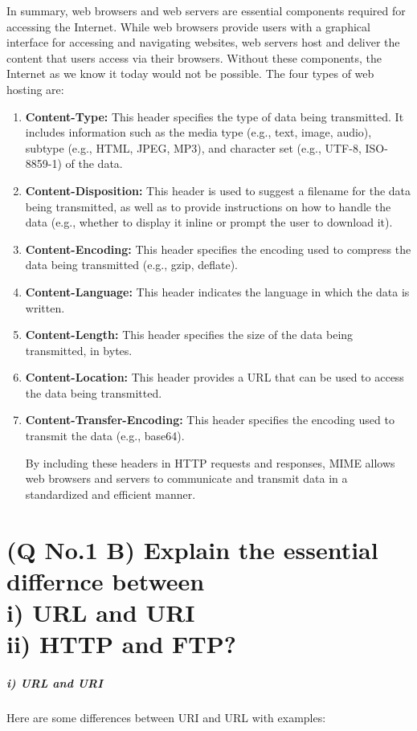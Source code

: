 \documentclass[11pt]{article}
\begin{document}
In summary, web browsers and web servers are essential components required for accessing the Internet. While web browsers provide users with a graphical interface for accessing and navigating websites, web servers host and deliver the content that users access via their browsers. Without these components, the Internet as we know it today would not be possible.
The four types of web hosting are:
\begin{enumerate}
    \item \textbf{Content-Type:} This header specifies the type of data being transmitted. It includes information such as the media type (e.g., text, image, audio), subtype (e.g., HTML, JPEG, MP3), and character set (e.g., UTF-8, ISO-8859-1) of the data.

    \item \textbf{Content-Disposition:} This header is used to suggest a filename for the data being transmitted, as well as to provide instructions on how to handle the data (e.g., whether to display it inline or prompt the user to download it).
    
    \item \textbf{Content-Encoding:} This header specifies the encoding used to compress the data being transmitted (e.g., gzip, deflate).
    
    \item \textbf{Content-Language:} This header indicates the language in which the data is written.
    
    \item \textbf{Content-Length:} This header specifies the size of the data being transmitted, in bytes.
    
    \item \textbf{Content-Location:} This header provides a URL that can be used to access the data being transmitted.
    
    \item \textbf{Content-Transfer-Encoding:} This header specifies the encoding used to transmit the data (e.g., base64).
    
    By including these headers in HTTP requests and responses, MIME allows web browsers and servers to communicate and transmit data in a standardized and efficient manner.
\end{enumerate}


\pagebreak
\section{(Q No.1 B) Explain the essential differnce between \\ i) URL and URI \\ii) HTTP and FTP?}
\subparagraph{i) URL and URI\\}
Here are some differences between URI and URL with examples:
\end{document}
